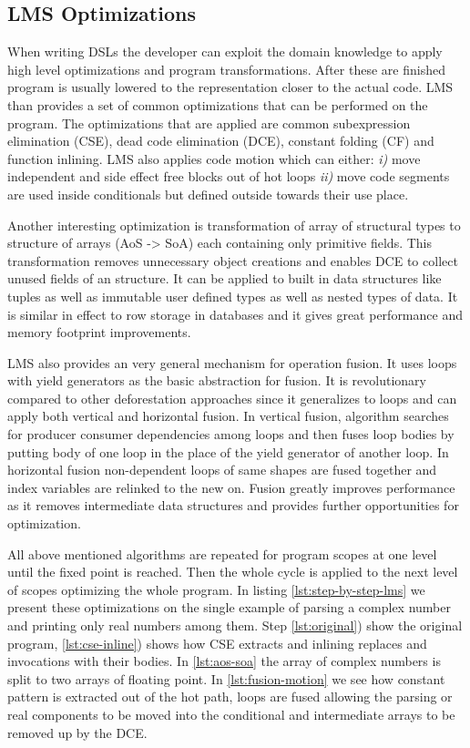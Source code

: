 \subsection{LMS Optimizations}
\label{sbusec:lms-optimizations}
When writing DSLs the developer can exploit the domain knowledge to apply high level optimizations and program transformations. After these are finished program is usually lowered to the representation closer to the actual code. LMS than provides a set of common optimizations that can be performed on the program. The optimizations that are applied are common subexpression elimination (CSE), dead code elimination (DCE), constant folding (CF) and function inlining. LMS also applies code motion which can either: \emph{i)} move independent and side effect free blocks out of hot loops \emph{ii)} move code segments are used inside conditionals but defined outside towards their use place.   

Another interesting optimization is transformation of array of structural types to structure of arrays (AoS -> SoA) each containing only primitive fields. This transformation removes unnecessary object creations and enables DCE to collect unused fields of an structure. It can be applied to built in data structures like tuples as well as immutable user defined types as well as nested types of data. It is similar in effect to row storage in databases and it gives great performance and memory footprint improvements. 

LMS also provides an very general mechanism for operation fusion. It uses loops with yield generators as the basic abstraction for fusion. It is revolutionary compared to other deforestation approaches since it generalizes to loops and can apply both vertical and horizontal fusion. In vertical fusion, algorithm searches for producer consumer dependencies among loops and then fuses loop bodies by putting body of one loop in the place of the yield generator of another loop. In horizontal fusion non-dependent loops of same shapes are fused together and index variables are relinked to the new on. Fusion greatly improves performance as it removes intermediate data structures and provides further opportunities for optimization.  

All above mentioned algorithms are repeated for program scopes at one level until the fixed point is reached. Then the whole cycle is applied to the next level of scopes optimizing the whole program. In listing \ref{lst:step-by-step-lms} we present these optimizations on the single example of parsing a complex number and printing only real numbers among them. Step \ref{lst:original}) show the original program, \ref{lst:cse-inline}) shows how CSE extracts  and inlining replaces  and  invocations with their bodies. In \ref{lst:aos-soa} the array  of complex numbers is split to two arrays of floating point. In \ref{lst:fusion-motion} we see how constant pattern is extracted out of the hot path, loops are fused allowing the parsing or real components to be moved into the conditional and intermediate arrays to be removed up by the DCE. 

